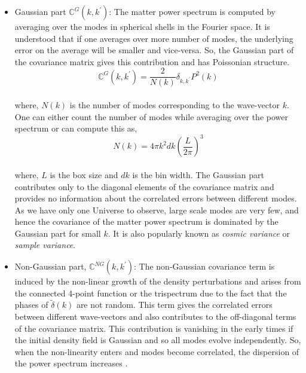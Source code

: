 \begin{itemize}
	\item Gaussian part $\mathbb{C}^{G}(k,k^{\prime})$: The matter power spectrum is computed
			by averaging over the modes in spherical shells in the Fourier space. It 
			is understood that if one averages over more number of modes, the underlying
			error on the average will be smaller and vice-versa. So, the Gaussian part
			of the covariance matrix gives this contribution and has Poissonian
			structure. 
			\begin{equation}
				\mathbb{C}^{G}(k,k^{\prime}) = \dfrac{2}{N(k)} \delta_{k,k^{\prime}} P^2(k)
			\end{equation}
			\\
			where, $N(k)$ is the number of modes corresponding to the wave-vector $k$. One 
			can either count the number of modes while averaging over the power spectrum
			or can compute this as,
			\begin{equation}
				N(k) = 4 \pi k^2 dk \left( \dfrac{L}{2\pi} \right)^3
			\end{equation}
			\\
			where, $L$ is the box size and $dk$ is the bin width. The Gaussian part 
			contributes only to the diagonal elements of the covariance matrix and provides no 
			information about the correlated errors between different modes. As we have
			only one Universe to observe, large scale modes are very few, and hence
			the covariance of the matter power spectrum is dominated by the Gaussian
			part for small $k$. It is also popularly known as {\it cosmic variance}
			or {\it sample variance}.

	\item Non-Gaussian part, $\mathbb{C}^{NG}(k,k^{\prime})$: 
			The non-Gaussian covariance term is 
			induced by the non-linear growth of the density perturbations and 
			arises from the connected 4-point 
			function or the trispectrum due to the fact that the phases of $\tilde{\delta}(k)$ are 
			not random. This term gives the correlated errors between
			different wave-vectors and also contributes to the off-diagonal terms
			of the covariance matrix. This contribution is vanishing in the early 
			times if the initial density field is Gaussian and so all modes evolve
			independently. So, when the non-linearity enters and modes become
			correlated, the dispersion of the power spectrum increases 
			\cite{1999MNRAS.308.1179M}.


\end{itemize}
